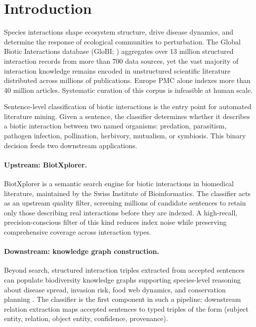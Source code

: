 \documentclass[12pt,a4paper]{article}
\begin{document}
\section{Introduction}
\label{sec:intro}

Species interactions shape ecosystem structure, drive disease dynamics,
and determine the response of ecological communities to perturbation.
The Global Biotic Interactions database (GloBI; \citealt{poelen2014global})
aggregates over 13 million structured interaction records from more than 700
data sources, yet the vast majority of interaction knowledge remains encoded
in unstructured scientific literature distributed across millions of
publications. Europe PMC alone indexes more than 40 million articles.
Systematic curation of this corpus is infeasible at human scale.

Sentence-level classification of biotic interactions is the entry point
for automated literature mining. Given a sentence, the classifier determines
whether it describes a biotic interaction between two named organisms:
predation, parasitism, pathogen infection, pollination, herbivory, mutualism,
or symbiosis. This binary decision feeds two downstream applications.

\paragraph{Upstream: BiotXplorer.}
BiotXplorer \citep{sibils2023biotxplorer} is a semantic search engine for
biotic interactions in biomedical literature, maintained by the Swiss Institute
of Bioinformatics. The classifier acts as an upstream quality filter, screening
millions of candidate sentences to retain only those describing real interactions
before they are indexed. A high-recall, precision-conscious filter of this kind
reduces index noise while preserving comprehensive coverage across interaction
types.

\paragraph{Downstream: knowledge graph construction.}
Beyond search, structured interaction triples extracted from accepted sentences
can populate biodiversity knowledge graphs \citep{chen2023biodiversity}
supporting species-level reasoning about disease spread, invasion risk,
food web dynamics, and conservation planning \citep{poisot2021global}.
The classifier is the first component in such a pipeline; downstream relation
extraction maps accepted sentences to typed triples of the form
(subject entity, relation, object entity, confidence, provenance).
\end{document}
